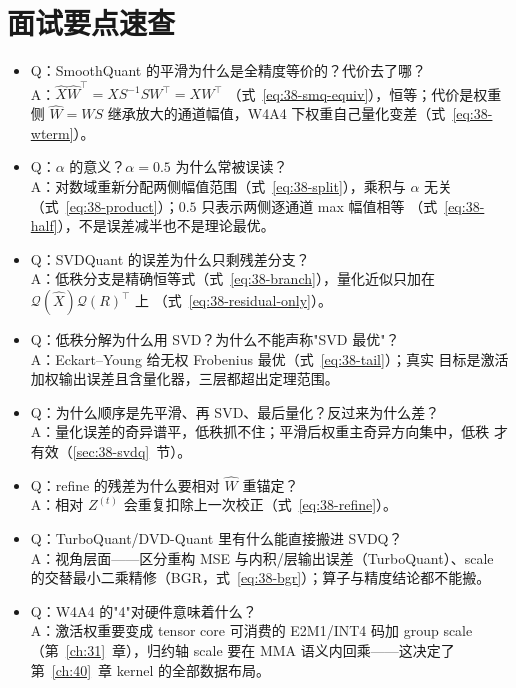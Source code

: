 \section{面试要点速查}

\begin{itemize}[itemsep=1pt,topsep=2pt]
  \item Q：SmoothQuant 的平滑为什么是全精度等价的？代价去了哪？\\
        A：$\widehat X\widehat W^{\top}=XS^{-1}SW^{\top}=XW^{\top}$
        （式~\ref{eq:38-smq-equiv}），恒等；代价是权重侧 $\widehat W=WS$
        继承放大的通道幅值，W4A4 下权重自己量化变差（式~\ref{eq:38-wterm}）。
  \item Q：$\alpha$ 的意义？$\alpha=0.5$ 为什么常被误读？\\
        A：对数域重新分配两侧幅值范围（式~\ref{eq:38-split}），乘积与 $\alpha$
        无关（式~\ref{eq:38-product}）；$0.5$ 只表示两侧逐通道 max 幅值相等
        （式~\ref{eq:38-half}），不是误差减半也不是理论最优。
  \item Q：SVDQuant 的误差为什么只剩残差分支？\\
        A：低秩分支是精确恒等式（式~\ref{eq:38-branch}），量化近似只加在
        $\mathcal Q(\widehat X)\mathcal Q(R)^{\top}$ 上
        （式~\ref{eq:38-residual-only}）。
  \item Q：低秩分解为什么用 SVD？为什么不能声称"SVD 最优"？\\
        A：Eckart--Young 给无权 Frobenius 最优（式~\ref{eq:38-tail}）；真实
        目标是激活加权输出误差且含量化器，三层都超出定理范围。
  \item Q：为什么顺序是先平滑、再 SVD、最后量化？反过来为什么差？\\
        A：量化误差的奇异谱平，低秩抓不住；平滑后权重主奇异方向集中，低秩
        才有效（\ref{sec:38-svdq}~节）。
  \item Q：refine 的残差为什么要相对 $\widehat W$ 重锚定？\\
        A：相对 $Z^{(t)}$ 会重复扣除上一次校正（式~\ref{eq:38-refine}）。
  \item Q：TurboQuant/DVD-Quant 里有什么能直接搬进 SVDQ？\\
        A：视角层面——区分重构 MSE 与内积/层输出误差（TurboQuant）、scale
        的交替最小二乘精修（BGR，式~\ref{eq:38-bgr}）；算子与精度结论都不能搬。
  \item Q：W4A4 的"4"对硬件意味着什么？\\
        A：激活权重要变成 tensor core 可消费的 E2M1/INT4 码加 group scale
        （第~\ref{ch:31}~章），归约轴 scale 要在 MMA 语义内回乘——这决定了
        第~\ref{ch:40}~章 kernel 的全部数据布局。
\end{itemize}

